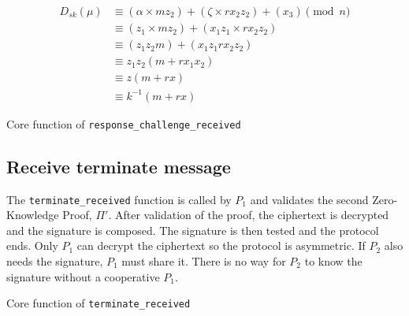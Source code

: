 \begin{equation*}
\begin{split}
  D_{sk}(\mu) &\equiv (\alpha \times mz_2) + (\zeta \times rx_2z_2) + (x_3) \pmod n \\
              &\equiv (z_1 \times mz_2) + (x_1z_1 \times rx_2z_2)  \\
              &\equiv (z_1z_2m) + (x_1z_1rx_2z_2)  \\
              &\equiv z_1z_2(m + rx_1x_2)  \\
              &\equiv z(m + rx)  \\
              &\equiv k^{-1}(m + rx)
\end{split}
\end{equation*}

\begin{longlisting}
	\caption{Core function of \texttt{response\_challenge\_received}}
	\label{lst:implRespChallengeReceivedFunc}
\end{longlisting}

\subsection{Receive terminate message}

The \texttt{terminate\_received} function is called by $P_1$ and validates the
second Zero-Knowledge Proof, $\Pi'$. After validation of the proof, the
ciphertext is decrypted and the signature is composed. The signature is then
tested and the protocol ends. Only $P_1$ can decrypt the ciphertext so the
protocol is asymmetric. If $P_2$ also needs the signature, $P_1$ must share it.
There is no way for $P_2$ to know the signature without a cooperative $P_1$.

\begin{longlisting}
	\caption{Core function of \texttt{terminate\_received}}
	\label{lst:implTerminateReceivedFunc}
\end{longlisting}
